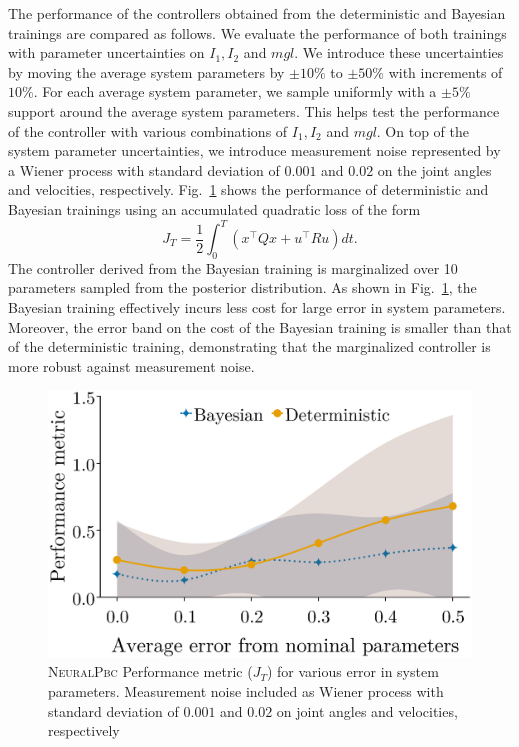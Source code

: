 %
The performance of the controllers obtained from the deterministic and Bayesian
trainings are compared as follows.
%
%
We evaluate the performance of both trainings with parameter uncertainties
on $I_1, I_2$ and $mgl$. 
%
We introduce these uncertainties by moving the average
system parameters by $\pm 10\%$ to $\pm 50\%$ with increments of $10\%$. 
%
For each average system parameter, we sample uniformly with a $\pm 5\%$ support
around the average system parameters. 
%
This helps test the performance of the controller with various combinations of
$I_1, I_2$ and $mgl$.
%
On top of the system parameter uncertainties, we introduce measurement noise
represented by a Wiener process with standard deviation of $0.001$ and $0.02$ on
the joint angles and velocities, respectively. 
%
Fig.~\ref{fig:comparison_neuralpbc} shows the performance of deterministic and
Bayesian trainings using an accumulated quadratic loss of the form
\begin{equation} J_T = \frac{1}{2}\int_0^T \left(x^\top Qx + u^\top Ru \right) dt.
  \label{eq:performance_metric} \end{equation}
%
The controller derived from the Bayesian training is marginalized over 10
parameters sampled from the posterior distribution. 
%
As shown in Fig.~\ref{fig:comparison_neuralpbc}, the Bayesian training
effectively incurs less cost for large error in system parameters.
%
Moreover, the error band on the cost of the Bayesian training is smaller than
that of the deterministic training, demonstrating that the marginalized
controller is more robust against measurement noise.
%   
\begin{figure}[tb]
    \centering
    \includegraphics[clip,width=0.8\columnwidth]{./figures/bandplot2.eps}%
    \caption{\textsc{NeuralPbc} Performance metric ($J_T$) for various
    error in system parameters. Measurement noise included as Wiener process
    with standard deviation of $0.001$ and $0.02$ on joint angles and
    velocities, respectively}
    \label{fig:comparison_neuralpbc}
\end{figure}


